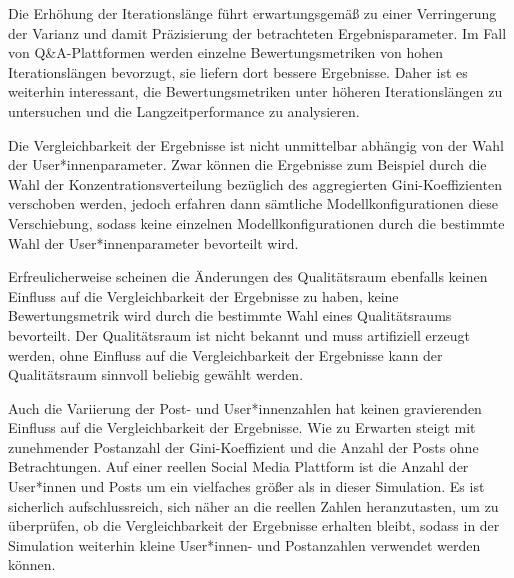Die Erhöhung der Iterationslänge führt erwartungsgemäß zu einer Verringerung der Varianz und damit Präzisierung der betrachteten Ergebnisparameter. Im Fall von Q\&A-Plattformen werden einzelne Bewertungsmetriken von hohen Iterationslängen bevorzugt, sie liefern dort bessere Ergebnisse. Daher ist es weiterhin interessant, die Bewertungsmetriken unter höheren Iterationslängen zu untersuchen und die Langzeitperformance zu analysieren.

Die Vergleichbarkeit der Ergebnisse ist nicht unmittelbar abhängig von der Wahl der User*innenparameter. Zwar können die Ergebnisse zum Beispiel durch die Wahl der Konzentrationsverteilung bezüglich des aggregierten Gini-Koeffizienten verschoben werden, jedoch erfahren dann sämtliche Modellkonfigurationen diese Verschiebung, sodass keine einzelnen Modellkonfigurationen durch die bestimmte Wahl der User*innenparameter bevorteilt wird.

Erfreulicherweise scheinen die Änderungen des Qualitätsraum ebenfalls keinen Einfluss auf die Vergleichbarkeit der Ergebnisse zu haben, keine Bewertungsmetrik wird durch die bestimmte Wahl eines Qualitätsraums bevorteilt. Der Qualitätsraum ist nicht bekannt und muss artifiziell erzeugt werden, ohne Einfluss auf die Vergleichbarkeit der Ergebnisse kann der Qualitätsraum sinnvoll beliebig gewählt werden.

Auch die Variierung der Post- und User*innenzahlen hat keinen gravierenden Einfluss auf die Vergleichbarkeit der Ergebnisse. Wie zu Erwarten steigt mit zunehmender Postanzahl der Gini-Koeffizient und die Anzahl der Posts ohne Betrachtungen. Auf einer reellen Social Media Plattform ist die Anzahl der User*innen und Posts um ein vielfaches größer als in dieser Simulation. Es ist sicherlich aufschlussreich, sich näher an die reellen Zahlen heranzutasten, um zu überprüfen, ob die Vergleichbarkeit der Ergebnisse erhalten bleibt, sodass in der Simulation weiterhin kleine User*innen- und Postanzahlen verwendet werden können.